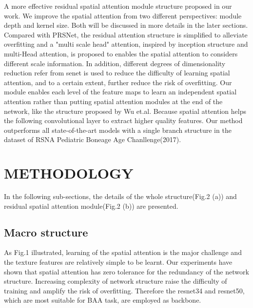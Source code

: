 \documentclass{article}
\begin{document}
A more effective residual spatial attention module structure proposed in our work. We improve the spatial attention from two different perspectives: module depth and kernel size. Both will be discussed in more details in the later sections. Compared with PRSNet\cite{ji2019prsnet}, the residual attention structure is simplified to alleviate overfitting and a "multi scale head" attention, inspired by inception structure\cite{szegedy2016rethinking} and multi-Head attention\cite{vaswani2017attention}, is proposed to enables the spatial attention to considers different scale information. In addition, different degrees of dimensionality reduction refer from senet\cite{hu2018squeeze} is used to reduce the difficulty of learning spatial attention, and to a certain extent, further reduce the risk of overfitting. Our module enables each level of the feature maps to learn an independent spatial attention rather than putting spatial attention modules at the end of the network, like the structure proposed by Wu et.al\cite{wu2019residual}. Because spatial attention helps the following convolutional layer to extract higher quality features. Our method outperforms all state-of-the-art models with a single branch structure in the dataset of RSNA Pediatric Boneage Age Chanllenge(2017).



\section{METHODOLOGY}
\label{sec:format}
In the following sub-sections, the details of the whole structure(Fig.2 (a)) and residual spatial attention module(Fig.2 (b)) are presented.
\subsection{Macro structure}
\label{ssec:subhead1}
As Fig.1 illustrated, learning of the spatial attention is the major challenge and the texture features are relatively simple to be learnt. Our experiments have shown that spatial attention has zero tolerance for the redundancy of the network structure. Increasing complexity of network structure raise the difficulty of training and amplify the risk of overfitting. Therefore the resnet34 and resnet50\cite{he2016deep}, which are most suitable for BAA task, are employed as backbone.
\end{document}
